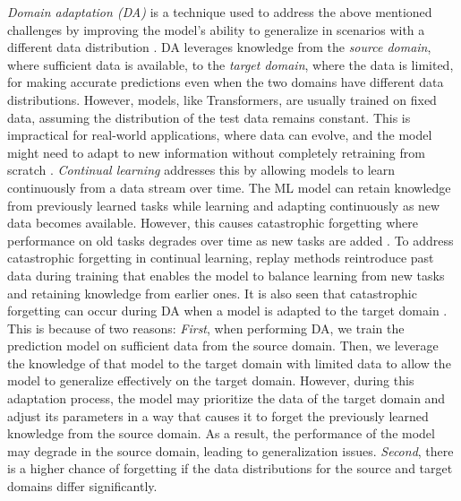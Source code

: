 \documentclass[letterpaper]{article} %
\begin{document}

\emph{Domain adaptation (DA)} is a technique used to address the above  mentioned challenges by improving the model's ability to generalize in scenarios with a different data distribution \cite{farahani2021brief, zhuang2020comprehensive}. DA leverages knowledge from the \emph{source domain}, where sufficient data is available, to the \emph{target domain}, where the data is limited, for making accurate predictions even when the two domains have different data distributions. However, models, like Transformers, are usually trained on fixed data, assuming the distribution of the test data remains constant. This is impractical for real-world applications, where data can evolve, and the model might need to adapt to new information without completely retraining from scratch \cite{kirkpatrick2017overcoming}. \emph{Continual learning} \cite{wang2023comprehensive} addresses this by allowing models to learn continuously from a data stream over time. The ML model can retain knowledge from previously learned tasks while learning and adapting continuously as new data becomes available. However, this causes catastrophic forgetting where performance on old tasks degrades over time as new tasks are added \cite{zizzo2022federated}. To address catastrophic forgetting in continual learning, replay methods \cite{bagus2021investigation} reintroduce past data during training that enables the model to balance learning from new tasks and retaining knowledge from earlier ones. It is also seen that catastrophic forgetting can occur during DA when a model is adapted to the target domain \cite{xu2020forget, saunders2022domain}. This is because of two reasons: \emph{First}, when performing DA, we train the prediction model on sufficient data from the source domain. Then, we leverage the knowledge of that model to the target domain with limited data to allow the model to generalize effectively on the target domain. However, during this adaptation process, the model may prioritize the data of the target domain and adjust its parameters in a way that causes it to forget the previously learned knowledge from the source domain. As a result, the performance of the model may degrade in the source domain, leading to generalization issues. \emph{Second}, there is a higher chance of forgetting if the data distributions for the source and target domains differ significantly.
\end{document}
